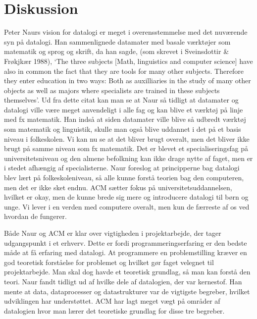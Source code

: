 \section{Diskussion}
Peter Naurs vision for datalogi er meget i overensstemmelse med det nuværende syn på datalogi.
Han sammenlignede datamater med basale værktøjer som matematik og 
sprog og skrift, da han sagde, (som skrevet i Sveinsdottir & Frøkjkær 1988), 
`The three subjects [Math, linguistics and computer science] have also in 
common the fact that they are tools for many other subjects. Therefore 
they enter education in two ways: Both as auxilliaries in the study of many other objects as well 
as majors where specialists are trained in these subjects themselves'. 
Ud fra dette citat kan man se at Naur så tidligt at datamater og datalogi ville være meget anvendeligt 
i alle fag og kan blive et værktøj på 
linje med fx matematik. Han indså at siden datamater ville blive så udbredt 
værktøj som matematik og linguistik, skulle man også blive uddannet 
i det på et basis niveau i folkeskolen. Vi kan nu se at det bliver brugt overalt, men det bliver ikke brugt på 
samme niveau som fx matematik. Det er blevet et specialiseringsfag på universitetsniveau og den 
almene befolkning kan ikke drage nytte af faget, men er i stedet afhængig af specialisterne. Naur 
foreslog at principperne bag datalogi blev lært på folkeskoleniveau, så alle kunne forstå teorien 
bag den computeren, men det er ikke sket endnu. ACM sætter fokus på universitetsuddannelsen, 
hvilket er okay, men de kunne brede sig mere og introducere datalogi til børn og unge. Vi lever 
i en verden med computere overalt, men kun de færreste af os ved hvordan de fungerer.

Både Naur og ACM er klar over vigtigheden i projektarbejde, der tager udgangspunkt i et erhverv. 
Dette er fordi programmeringserfaring er den bedste måde at få erfaring med datalogi. At programmere 
en problemstilling kræver en god teoretisk forståelse for problemet og hvilket gør faget velegnet til 
projektarbejde. Man skal dog havde et teoretisk grundlag, så man kan forstå den teori. Naur fandt 
tidligt ud af hvilke dele af datalogien, der var kernestof. Han mente at data, dataprocesser og 
datastrukturer var de vigtigste begreber, hvilket udviklingen har understøttet. ACM har lagt meget 
vægt på områder af datalogien hvor man lærer det teoretiske grundlag for disse tre begreber.


